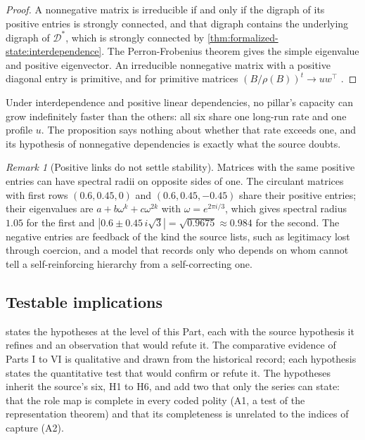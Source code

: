 \documentclass[11pt,letterpaper]{article}
\theoremstyle{definition}
\theoremstyle{remark}
\newtheorem{remark}[theorem]{Remark}
\newcommand{\Dstar}{\mathcal{D}^{*}}
\begin{document}
\begin{proof}
A nonnegative matrix is irreducible if and only if the digraph of its positive entries is strongly connected, and that digraph contains the underlying digraph of $\Dstar$, which is strongly connected by \cref{thm:formalized-state:interdependence}. The Perron-Frobenius theorem gives the simple eigenvalue and positive eigenvector. An irreducible nonnegative matrix with a positive diagonal entry is primitive, and for primitive matrices $(B/\rho(B))^t\to uw^{\top}$ \citep{horn2012}.
\end{proof}

Under interdependence and positive linear dependencies, no pillar's capacity can grow indefinitely faster than the others: all six share one long-run rate and one profile $u$. The proposition says nothing about whether that rate exceeds one, and its hypothesis of nonnegative dependencies is exactly what the source doubts.

\begin{remark}[Positive links do not settle stability]
\label{rem:formalized-state:sign}
Matrices with the same positive entries can have spectral radii on opposite sides of one. The circulant matrices with first rows $(0.6,0.45,0)$ and $(0.6,0.45,-0.45)$ share their positive entries; their eigenvalues are $a+b\omega^k+c\omega^{2k}$ with $\omega=e^{2\pi i/3}$, which gives spectral radius $1.05$ for the first and $|0.6\pm0.45\,i\sqrt3|=\sqrt{0.9675}\approx0.984$ for the second. The negative entries are feedback of the kind the source lists, such as legitimacy lost through coercion, and a model that records only who depends on whom cannot tell a self-reinforcing hierarchy from a self-correcting one.
\end{remark}

\subsection{Testable implications}

 states the hypotheses at the level of this Part, each with the source hypothesis it refines and an observation that would refute it. The comparative evidence of Parts I to VI is qualitative and drawn from the historical record; each hypothesis states the quantitative test that would confirm or refute it. The hypotheses inherit the source's six, H1 to H6, and add two that only the series can state: that the role map is complete in every coded polity (A1, a test of the representation theorem) and that its completeness is unrelated to the indices of capture (A2).
\end{document}
